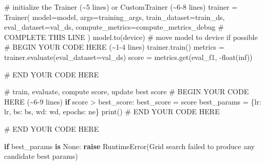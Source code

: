 \documentclass[
  letterpaper,
  DIV=11,
  numbers=noendperiod]{scrartcl}
\newenvironment{Shaded}{\begin{snugshade}}{\end{snugshade}}
\newcommand{\BuiltInTok}[1]{\textcolor[rgb]{0.00,0.23,0.31}{#1}}
\newcommand{\CommentTok}[1]{\textcolor[rgb]{0.37,0.37,0.37}{#1}}
\newcommand{\ControlFlowTok}[1]{\textcolor[rgb]{0.00,0.23,0.31}{\textbf{#1}}}
\newcommand{\KeywordTok}[1]{\textcolor[rgb]{0.00,0.23,0.31}{\textbf{#1}}}
\newcommand{\NormalTok}[1]{\textcolor[rgb]{0.00,0.23,0.31}{#1}}
\newcommand{\OperatorTok}[1]{\textcolor[rgb]{0.37,0.37,0.37}{#1}}
\newcommand{\PreprocessorTok}[1]{\textcolor[rgb]{0.68,0.00,0.00}{#1}}
\newcommand{\RegionMarkerTok}[1]{\textcolor[rgb]{0.00,0.23,0.31}{#1}}
\newcommand{\StringTok}[1]{\textcolor[rgb]{0.13,0.47,0.30}{#1}}
\newcommand{\VariableTok}[1]{\textcolor[rgb]{0.07,0.07,0.07}{#1}}
\begin{document}
\begin{Shaded}
\begin{Highlighting}[]
        \CommentTok{\# initialize the Trainer (\textasciitilde{}5 lines) or CustomTrainer (\textasciitilde{}6{-}8 lines)}
\NormalTok{        trainer }\OperatorTok{=}\NormalTok{ Trainer(}
\NormalTok{        model}\OperatorTok{=}\NormalTok{model,}
\NormalTok{        args}\OperatorTok{=}\NormalTok{training\_args,}
\NormalTok{        train\_dataset}\OperatorTok{=}\NormalTok{train\_ds,}
\NormalTok{        eval\_dataset}\OperatorTok{=}\NormalTok{val\_ds,}
\NormalTok{        compute\_metrics}\OperatorTok{=}\NormalTok{compute\_metrics\_debug}
     \CommentTok{\# COMPLETE THIS LINE}
\NormalTok{        )}
\NormalTok{        model.to(device)}
        \CommentTok{\# move model to device if possible}
        \CommentTok{\# }\RegionMarkerTok{BEGIN}\CommentTok{ YOUR CODE HERE (\textasciitilde{}1{-}4 lines)}
\NormalTok{        trainer.train()}
\NormalTok{        metrics }\OperatorTok{=}\NormalTok{ trainer.evaluate(eval\_dataset}\OperatorTok{=}\NormalTok{val\_ds)}
\NormalTok{        score }\OperatorTok{=}\NormalTok{ metrics.get(}\StringTok{\textquotesingle{}eval\_f1\textquotesingle{}}\NormalTok{, }\OperatorTok{{-}}\BuiltInTok{float}\NormalTok{(}\StringTok{\textquotesingle{}inf\textquotesingle{}}\NormalTok{))}


        \CommentTok{\# }\RegionMarkerTok{END}\CommentTok{ YOUR CODE HERE}

        \CommentTok{\# train, evaluate, compute score, update best score}
        \CommentTok{\# }\RegionMarkerTok{BEGIN}\CommentTok{ YOUR CODE HERE (\textasciitilde{}6{-}9 lines)}
        \ControlFlowTok{if}\NormalTok{ score }\OperatorTok{\textgreater{}}\NormalTok{ best\_score:}
\NormalTok{            best\_score }\OperatorTok{=}\NormalTok{ score}
\NormalTok{            best\_params }\OperatorTok{=}\NormalTok{ \{}\StringTok{\textquotesingle{}lr\textquotesingle{}}\NormalTok{: lr, }\StringTok{\textquotesingle{}bs\textquotesingle{}}\NormalTok{: bs, }\StringTok{\textquotesingle{}wd\textquotesingle{}}\NormalTok{: wd, }\StringTok{\textquotesingle{}epochs\textquotesingle{}}\NormalTok{: ne\}}
            \BuiltInTok{print}\NormalTok{()}
        \CommentTok{\# }\RegionMarkerTok{END}\CommentTok{ YOUR CODE HERE}

    \CommentTok{\# }\RegionMarkerTok{END}\CommentTok{ YOUR CODE HERE}

    \ControlFlowTok{if}\NormalTok{ best\_params }\KeywordTok{is} \VariableTok{None}\NormalTok{:}
        \ControlFlowTok{raise} \PreprocessorTok{RuntimeError}\NormalTok{(}\StringTok{\textquotesingle{}Grid search failed to produce any candidate best params\textquotesingle{}}\NormalTok{)}


\end{Highlighting}
\end{Shaded}
\end{document}
